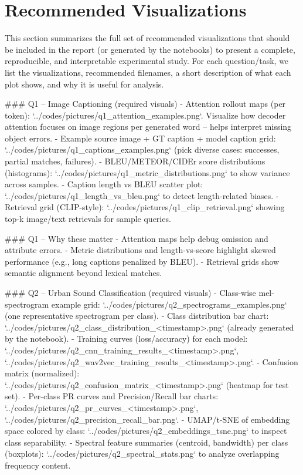 \documentclass[conference]{IEEEtran}
\begin{document}
\section{Recommended Visualizations}\label{sec:visualizations}

This section summarizes the full set of recommended visualizations that should be included in the report (or generated by the notebooks) to present a complete, reproducible, and interpretable experimental study. For each question/task, we list the visualizations, recommended filenames, a short description of what each plot shows, and why it is useful for analysis.

\iffalse
### Q1 -- Image Captioning (required visuals)
- Attention rollout maps (per token): `../codes/pictures/q1_attention_examples.png`. Visualize how decoder attention focuses on image regions per generated word -- helps interpret missing object errors.
- Example source image + GT caption + model caption grid: `../codes/pictures/q1_captions_examples.png` (pick diverse cases: successes, partial matches, failures).
- BLEU/METEOR/CIDEr score distributions (histograms): `../codes/pictures/q1_metric_distributions.png` to show variance across samples.
- Caption length vs BLEU scatter plot: `../codes/pictures/q1_length_vs_bleu.png` to detect length-related biases.
- Retrieval grid (CLIP-style): `../codes/pictures/q1_clip_retrieval.png` showing top-k image/text retrievals for sample queries.

### Q1 -- Why these matter
- Attention maps help debug omission and attribute errors.
- Metric distributions and length-vs-score highlight skewed performance (e.g., long captions penalized by BLEU).
- Retrieval grids show semantic alignment beyond lexical matches.

### Q2 -- Urban Sound Classification (required visuals)
- Class-wise mel-spectrogram example grid: `../codes/pictures/q2_spectrograms_examples.png` (one representative spectrogram per class).
- Class distribution bar chart: `../codes/pictures/q2_class_distribution_<timestamp>.png` (already generated by the notebook).
- Training curves (loss/accuracy) for each model: `../codes/pictures/q2_cnn_training_results_<timestamp>.png`, `../codes/pictures/q2_wav2vec_training_results_<timestamp>.png`.
- Confusion matrix (normalized): `../codes/pictures/q2_confusion_matrix_<timestamp>.png` (heatmap for test set).
- Per-class PR curves and Precision/Recall bar charts: `../codes/pictures/q2_pr_curves_<timestamp>.png`, `../codes/pictures/q2_precision_recall_bar.png`.
- UMAP/t-SNE of embedding space colored by class: `../codes/pictures/q2_embeddings_tsne.png` to inspect class separability.
- Spectral feature summaries (centroid, bandwidth) per class (boxplots): `../codes/pictures/q2_spectral_stats.png` to analyze overlapping frequency content.
\end{document}
